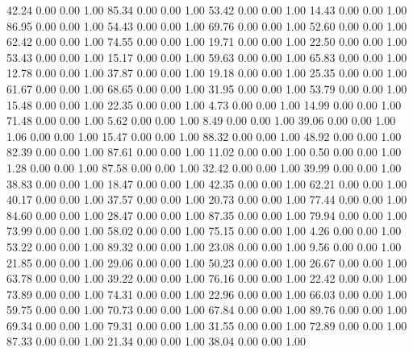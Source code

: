    42.24   0.00   0.00   1.00
   85.34   0.00   0.00   1.00
   53.42   0.00   0.00   1.00
   14.43   0.00   0.00   1.00
   86.95   0.00   0.00   1.00
   54.43   0.00   0.00   1.00
   69.76   0.00   0.00   1.00
   52.60   0.00   0.00   1.00
   62.42   0.00   0.00   1.00
   74.55   0.00   0.00   1.00
   19.71   0.00   0.00   1.00
   22.50   0.00   0.00   1.00
   53.43   0.00   0.00   1.00
   15.17   0.00   0.00   1.00
   59.63   0.00   0.00   1.00
   65.83   0.00   0.00   1.00
   12.78   0.00   0.00   1.00
   37.87   0.00   0.00   1.00
   19.18   0.00   0.00   1.00
   25.35   0.00   0.00   1.00
   61.67   0.00   0.00   1.00
   68.65   0.00   0.00   1.00
   31.95   0.00   0.00   1.00
   53.79   0.00   0.00   1.00
   15.48   0.00   0.00   1.00
   22.35   0.00   0.00   1.00
    4.73   0.00   0.00   1.00
   14.99   0.00   0.00   1.00
   71.48   0.00   0.00   1.00
    5.62   0.00   0.00   1.00
    8.49   0.00   0.00   1.00
   39.06   0.00   0.00   1.00
    1.06   0.00   0.00   1.00
   15.47   0.00   0.00   1.00
   88.32   0.00   0.00   1.00
   48.92   0.00   0.00   1.00
   82.39   0.00   0.00   1.00
   87.61   0.00   0.00   1.00
   11.02   0.00   0.00   1.00
    0.50   0.00   0.00   1.00
    1.28   0.00   0.00   1.00
   87.58   0.00   0.00   1.00
   32.42   0.00   0.00   1.00
   39.99   0.00   0.00   1.00
   38.83   0.00   0.00   1.00
   18.47   0.00   0.00   1.00
   42.35   0.00   0.00   1.00
   62.21   0.00   0.00   1.00
   40.17   0.00   0.00   1.00
   37.57   0.00   0.00   1.00
   20.73   0.00   0.00   1.00
   77.44   0.00   0.00   1.00
   84.60   0.00   0.00   1.00
   28.47   0.00   0.00   1.00
   87.35   0.00   0.00   1.00
   79.94   0.00   0.00   1.00
   73.99   0.00   0.00   1.00
   58.02   0.00   0.00   1.00
   75.15   0.00   0.00   1.00
    4.26   0.00   0.00   1.00
   53.22   0.00   0.00   1.00
   89.32   0.00   0.00   1.00
   23.08   0.00   0.00   1.00
    9.56   0.00   0.00   1.00
   21.85   0.00   0.00   1.00
   29.06   0.00   0.00   1.00
   50.23   0.00   0.00   1.00
   26.67   0.00   0.00   1.00
   63.78   0.00   0.00   1.00
   39.22   0.00   0.00   1.00
   76.16   0.00   0.00   1.00
   22.42   0.00   0.00   1.00
   73.89   0.00   0.00   1.00
   74.31   0.00   0.00   1.00
   22.96   0.00   0.00   1.00
   66.03   0.00   0.00   1.00
   59.75   0.00   0.00   1.00
   70.73   0.00   0.00   1.00
   67.84   0.00   0.00   1.00
   89.76   0.00   0.00   1.00
   69.34   0.00   0.00   1.00
   79.31   0.00   0.00   1.00
   31.55   0.00   0.00   1.00
   72.89   0.00   0.00   1.00
   87.33   0.00   0.00   1.00
   21.34   0.00   0.00   1.00
   38.04   0.00   0.00   1.00

